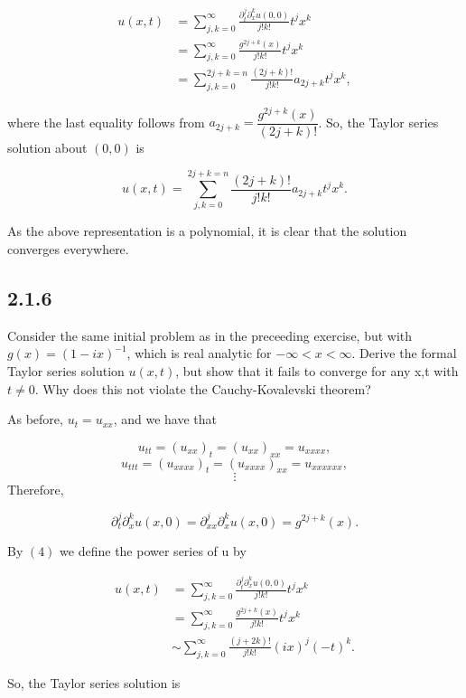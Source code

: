 \documentclass{article}
\begin{document}
\begin{flushleft}
\begin{equation*}
\begin{split}
u(x,t) & = \sum_{j,k=0}^\infty \frac{\partial_t^j \partial_x^k u(0,0)}{j!k!}t^jx^k \\
 & = \sum_{j,k=0}^\infty \frac{g^{2j+k}(x)}{j!k!}t^jx^k \\
 & = \sum_{j,k=0}^{2j+k=n} \frac{(2j+k)!}{j!k!}a_{2j+k}t^jx^k,
 \end{split}
\end{equation*}

where the last equality follows from $a_{2j+k}=\dfrac{g^{2j+k}(x)}{(2j+k)!}$. So, the Taylor series solution about $(0,0)$ is

$$u(x,t)=\sum_{j,k=0}^{2j+k=n} \frac{(2j+k)!}{j!k!}a_{2j+k}t^jx^k.$$

As the above representation is a polynomial, it is clear that the solution converges everywhere.

\subsection{\textbf{2.1.6}} Consider the same initial problem as in the preceeding exercise, but with $g(x)=(1-ix)^{-1}$, which is real analytic for $-\infty < x < \infty$. Derive the formal Taylor series solution $u(x,t)$, but show that it fails to converge for any x,t with $t\neq 0$. Why does this not violate the Cauchy-Kovalevski theorem?

As before, $u_t=u_{xx}$, and we have that

$$u_{tt} = (u_{xx})_t=(u_{xx})_{xx}=u_{xxxx},$$
$$u_{ttt} = (u_{xxxx})_t=(u_{xxxx})_{xx}=u_{xxxxxx},$$
$$\vdots$$
Therefore,

$$\partial_t^j \partial_x^k u(x,0)=\partial_{xx}^j \partial_x^k u(x,0)=g^{2j+k}(x) .$$

By $(4)$ we define the power series of u by

\textbf{\begin{equation*}
\begin{split}
u(x,t) & = \sum_{j,k=0}^\infty \frac{\partial_t^j \partial_x^k u(0,0)}{j!k!}t^jx^k \\
 & = \sum_{j,k=0}^\infty \frac{g^{2j+k}(x)}{j!k!}t^jx^k \\
 & \sim \sum_{j,k=0}^\infty \frac{(j+2k)!}{j!k!}(ix)^j(-t)^k.
 \end{split}
\end{equation*}}

So, the Taylor series solution is


\end{flushleft}
\end{document}
